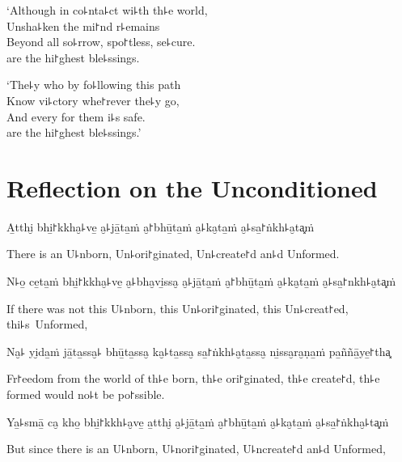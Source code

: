 `Although in co꜕nta꜕ct wi꜕th th꜕e world,\\
Unsha꜕ken the mi꜓nd r꜕emains\\
Beyond all so꜕rrow, spo꜓tless, se꜕cure.\\
 are the hi꜓ghest ble꜕ssings.

`The꜕y who  by fo꜕llowing this path\\
Know vi꜕ctory whe꜓rever the꜕y go,\\
And every  for them i꜕s safe.\\
 are the hi꜓ghest ble꜕ssings.'

\chapter[The Unconditioned]{Reflection on the Unconditioned}


\begin{leader}
\end{leader}

A̱tthi̮ bhi̱꜓kkha̮꜕ve̱ a̮꜕jā̱ta̱ṁ a̮꜓bhū̱ta̱ṁ a̮꜕ka̮ta̱ṁ a̮꜕sa̱꜓ṅkh꜕a̮ta͓ṁ

\begin{english}
  There is an U꜕nborn, Un꜕ori꜓ginated, Un꜕create꜓d an꜕d Unformed.
\end{english}

N꜕o̱ ce̱ta̱ṁ bhi̱꜓kkha̮꜕ve̱ a̮꜕bha̮vi̱ssa̮ a̮꜕jā̱ta̱ṁ a̮꜓bhū̱ta̱ṁ a̮꜕ka̮ta̱ṁ a̮꜕sa̱꜓nkh꜕a̮ta͓ṁ

\begin{english}
  If there was not this U꜕nborn, this Un꜕ori꜓ginated, this Un꜕creat꜓ed, thi꜕s~Unformed,
\end{english}

Na̮꜕ yi̮da̱ṁ jā̱ta̱ssa̮꜕ bhū̱ta̱ssa̮ ka̮꜕ta̱ssa̮ sa̱꜓ṅkh꜕a̮ta̱ssa̮ ni̱ssa̮ra̮ṇa̱ṁ pa̱ññā̱ye̱꜓tha͓

\begin{english}
  Fr꜓eedom from the world of th꜕e born, th꜕e ori꜓ginated, th꜕e create꜓d, th꜕e formed would no꜕t be po꜓ssible.
\end{english}

Ya̱꜕smā̱ ca̮ kho̱ bhi̱꜓kkh꜕a̮ve̱ a̱tthi̮ a̮꜕jā̱ta̱ṁ a̮꜓bhū̱ta̱ṁ a̮꜕ka̮ta̱ṁ a̮꜕sa̱꜓ṅkha̮꜕ta͓ṁ

\begin{english}
  But since there is an U꜕nborn, U꜕nori꜓ginated, U꜕ncreate꜓d an꜕d Unformed,
\end{english}

